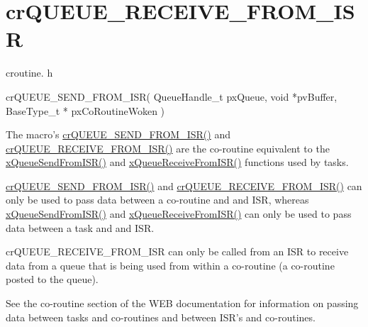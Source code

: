 \hypertarget{group__crQUEUE__RECEIVE__FROM__ISR}{\section{cr\-Q\-U\-E\-U\-E\-\_\-\-R\-E\-C\-E\-I\-V\-E\-\_\-\-F\-R\-O\-M\-\_\-\-I\-S\-R}
\label{group__crQUEUE__RECEIVE__FROM__ISR}
}
croutine. h 
\begin{DoxyPre}
  crQUEUE\_SEND\_FROM\_ISR(
                            QueueHandle\_t pxQueue,
                            void *pvBuffer,
                            BaseType\_t * pxCoRoutineWoken
                       )\end{DoxyPre}


The macro's \hyperlink{croutine_8h_ac8eb0a81c5cf69de7e4edd73ce44a3be}{cr\-Q\-U\-E\-U\-E\-\_\-\-S\-E\-N\-D\-\_\-\-F\-R\-O\-M\-\_\-\-I\-S\-R()} and \hyperlink{croutine_8h_a9c0fa977ca69adbddb4811affa2a71f7}{cr\-Q\-U\-E\-U\-E\-\_\-\-R\-E\-C\-E\-I\-V\-E\-\_\-\-F\-R\-O\-M\-\_\-\-I\-S\-R()} are the co-\/routine equivalent to the \hyperlink{queue_8h_a21d5919ed26c21d121df4a4debeb643c}{x\-Queue\-Send\-From\-I\-S\-R()} and \hyperlink{queue_8h_acdf528f5c91131ae2f31c669cfd65758}{x\-Queue\-Receive\-From\-I\-S\-R()} functions used by tasks.

\hyperlink{croutine_8h_ac8eb0a81c5cf69de7e4edd73ce44a3be}{cr\-Q\-U\-E\-U\-E\-\_\-\-S\-E\-N\-D\-\_\-\-F\-R\-O\-M\-\_\-\-I\-S\-R()} and \hyperlink{croutine_8h_a9c0fa977ca69adbddb4811affa2a71f7}{cr\-Q\-U\-E\-U\-E\-\_\-\-R\-E\-C\-E\-I\-V\-E\-\_\-\-F\-R\-O\-M\-\_\-\-I\-S\-R()} can only be used to pass data between a co-\/routine and and I\-S\-R, whereas \hyperlink{queue_8h_a21d5919ed26c21d121df4a4debeb643c}{x\-Queue\-Send\-From\-I\-S\-R()} and \hyperlink{queue_8h_acdf528f5c91131ae2f31c669cfd65758}{x\-Queue\-Receive\-From\-I\-S\-R()} can only be used to pass data between a task and and I\-S\-R.

cr\-Q\-U\-E\-U\-E\-\_\-\-R\-E\-C\-E\-I\-V\-E\-\_\-\-F\-R\-O\-M\-\_\-\-I\-S\-R can only be called from an I\-S\-R to receive data from a queue that is being used from within a co-\/routine (a co-\/routine posted to the queue).

See the co-\/routine section of the W\-E\-B documentation for information on passing data between tasks and co-\/routines and between I\-S\-R's and co-\/routines.


